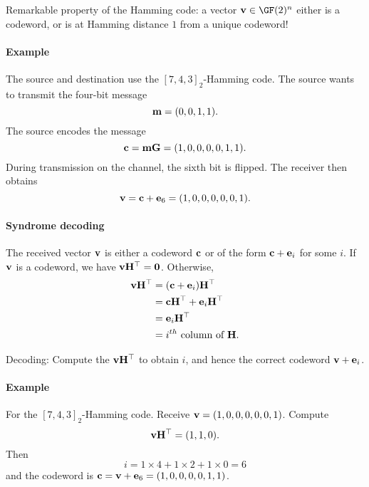 \documentclass[a4paper, 11pt, openany]{book}
\begin{document}
Remarkable property of the Hamming code: a vector ${\bf v} \in \GF(2)^n$ either is a codeword, or is at Hamming distance $1$ from a unique codeword!


\paragraph{Example}
The source and destination use the $[7,4,3]_2$-Hamming code. The source wants to transmit the four-bit message
\[
	{\bf m} = (0,0,1,1).
\]
The source encodes the message
\[
    {\bf c} = {\bf m}{\bf G} = (1,0,0,0,0,1,1).
\]
During transmission on the channel, the sixth bit is flipped. The receiver then obtains
\[
    {\bf v} = {\bf c} + {\bf e}_6 = (1,0,0,0,0,0,1).
\]



\paragraph{Syndrome decoding}
The received vector ${\bf v}$ is either a codeword ${\bf c}$ or of the form ${\bf c} + {\bf e}_i$ for some $i$. If ${\bf v}$ is a codeword, we have ${\bf v}{\bf H}^\top = {\bf 0}$. Otherwise,
\begin{align*}
	{\bf v}{\bf H}^\top &= ({\bf c}+{\bf e}_i){\bf H}^\top\\
	&= {\bf c}{\bf H}^\top + {\bf e}_i{\bf H}^\top\\
	&= {\bf e}_i{\bf H}^\top\\
	&= i^{th} \mbox{ column of } {\bf H}.
\end{align*}

Decoding: Compute the  ${\bf v}{\bf H}^\top$ to obtain $i$, and hence the correct codeword ${\bf v} + {\bf e}_i$.


\paragraph{Example}
For the $[7,4,3]_2$-Hamming code. Receive ${\bf v} = (1,0,0,0,0,0,1)$.
Compute
\[
	{\bf v}{\bf H}^\top = (1,1,0).
\]
Then
\[
    i = 1 \times 4 + 1 \times 2 + 1 \times 0 = 6
\]
and the codeword is ${\bf c} = {\bf v} + {\bf e}_6 = (1,0,0,0,0,1,1)$.
\end{document}
